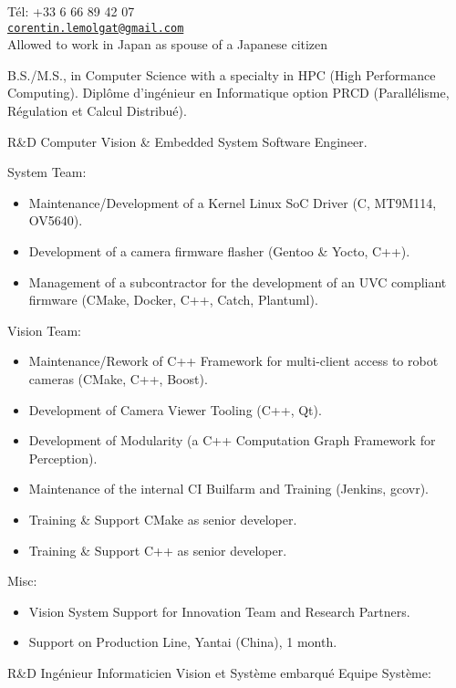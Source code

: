 \documentclass{article}
\begin{document}


T\'{e}l: +33 6 66 89 42 07\\
\href{mailto:corentin.lemolgat@gmail.com}{\texttt{corentin.lemolgat@gmail.com}}\\
Allowed to work in Japan as spouse of a Japanese citizen\\

\begin{llist}
 
 {
B.S./M.S., in Computer Science with a specialty in HPC (High Performance Computing).
} {
Dipl\^{o}me d'ing\'{e}nieur en Informatique option PRCD (Parall\'{e}lisme,
R\'{e}gulation et Calcul Distribu\'{e}).
}

{}
{}
\vspace{-0.33cm}

 {
R\&D Computer Vision \& Embedded System Software Engineer.\\
\vspace{-0.33cm}

System Team:
\begin{itemize}
\item Maintenance/Development of a Kernel Linux SoC Driver (C, MT9M114, OV5640).
\item Development of a camera firmware flasher (Gentoo \& Yocto, C++).
\item Management of a subcontractor for the development of an UVC compliant firmware (CMake, Docker, C++, Catch, Plantuml).
\end{itemize}
Vision Team:
\begin{itemize}
\item Maintenance/Rework of C++ Framework for multi-client access to robot cameras (CMake, C++, Boost).
\item Development of Camera Viewer Tooling (C++, Qt).
\item Development of Modularity (a C++ Computation Graph Framework for Perception).
\item Maintenance of the internal CI Builfarm and Training (Jenkins,
 gcovr).
\item Training \& Support CMake as senior developer.
\item Training \& Support C++ as senior developer.
\end{itemize}
Misc:
\begin{itemize}
\item Vision System Support for Innovation Team and Research Partners.
\item Support on Production Line, Yantai (China), 1 month.
\end{itemize}
}{
R\&D Ing\'{e}nieur Informaticien Vision et Syst\`{e}me embarqu\'{e}
\vspace{-0.33cm}
Equipe Syst\`{e}me:

}
\end{llist}
\end{document}
